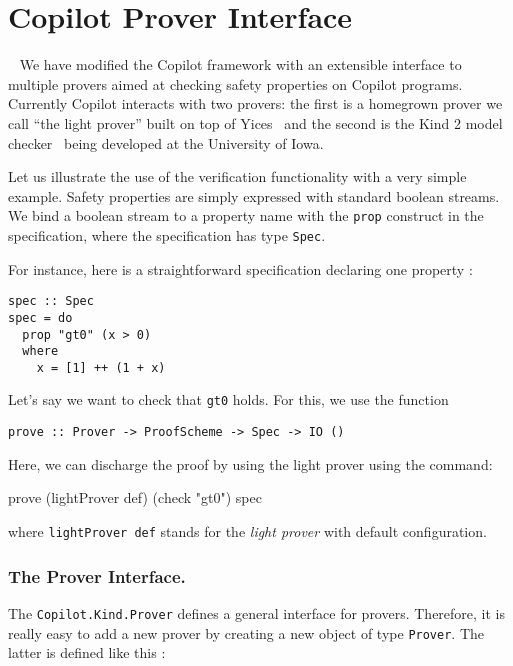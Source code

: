 \section{Copilot Prover Interface}~\label{sec:prover} 
We have modified  the Copilot framework with an extensible interface to multiple
provers aimed at checking  safety properties on Copilot
programs. Currently Copilot interacts with two provers: the first is a
homegrown prover we call ``the light prover'' built on top of
Yices~\cite{Dutertre:cav2014} and the second is the Kind 2 model checker~\cite{kind2} being developed at
the University of Iowa.  

Let us illustrate the use of the verification functionality with a
very simple example.  Safety properties are simply expressed with
standard boolean streams.  We bind a boolean stream to a property name
with the \texttt{prop} construct in the specification, where the
specification has type \texttt{Spec}.

For instance, here is a straightforward specification declaring one
property :

\begin{lstlisting}[frame=single]
spec :: Spec
spec = do
  prop "gt0" (x > 0)
  where
    x = [1] ++ (1 + x)
\end{lstlisting}

Let's say we want to check that \texttt{gt0} holds. For this, we use
the function

\begin{lstlisting}[frame=single]
    prove :: Prover -> ProofScheme -> Spec -> IO ()
\end{lstlisting}

Here, we can discharge the proof by  using the light prover using the command:
\begin{code}
prove (lightProver def) (check "gt0") spec
\end{code}
where \texttt{lightProver def} stands for the \emph{light prover} with
default configuration.  

\subsubsection{The Prover Interface.}\label{the-prover-interface}

The \texttt{Copilot.Kind.Prover} defines a general interface for
provers. Therefore, it is really easy to add a new prover by creating a
new object of type \texttt{Prover}. The latter is defined like this :

